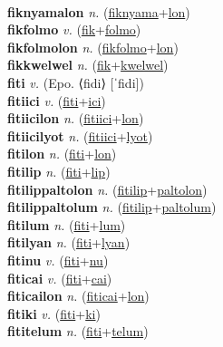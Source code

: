  \label{fiknyamales} \\
\textbf{fiknyamalon} \textit{n.} (\hyperref[fiknyama]{fiknyama}+\hyperref[lon]{lon})
 \label{fiknyamalon} \\
\textbf{fikfolmo} \textit{v.} (\hyperref[fik]{fik}+\hyperref[folmo]{folmo})
 \label{fikfolmo} \\
\textbf{fikfolmolon} \textit{n.} (\hyperref[fikfolmo]{fikfolmo}+\hyperref[lon]{lon})
 \label{fikfolmolon} \\
\textbf{fikkwelwel} \textit{n.} (\hyperref[fik]{fik}+\hyperref[kwelwel]{kwelwel})
 \label{fikkwelwel} \\
\textbf{fiti} \textit{v.} (Epo. ⟨fidi⟩ [ˈfidi])
 \label{fiti} \\
\textbf{fitiici} \textit{v.} (\hyperref[fiti]{fiti}+\hyperref[ici]{ici})
 \label{fitiici} \\
\textbf{fitiicilon} \textit{n.} (\hyperref[fitiici]{fitiici}+\hyperref[lon]{lon})
 \label{fitiicilon} \\
\textbf{fitiicilyot} \textit{n.} (\hyperref[fitiici]{fitiici}+\hyperref[lyot]{lyot})
 \label{fitiicilyot} \\
\textbf{fitilon} \textit{n.} (\hyperref[fiti]{fiti}+\hyperref[lon]{lon})
 \label{fitilon} \\
\textbf{fitilip} \textit{n.} (\hyperref[fiti]{fiti}+\hyperref[lip]{lip})
 \label{fitilip} \\
\textbf{fitilippaltolon} \textit{n.} (\hyperref[fitilip]{fitilip}+\hyperref[paltolon]{paltolon})
 \label{fitilippaltolon} \\
\textbf{fitilippaltolum} \textit{n.} (\hyperref[fitilip]{fitilip}+\hyperref[paltolum]{paltolum})
 \label{fitilippaltolum} \\
\textbf{fitilum} \textit{n.} (\hyperref[fiti]{fiti}+\hyperref[lum]{lum})
 \label{fitilum} \\
\textbf{fitilyan} \textit{n.} (\hyperref[fiti]{fiti}+\hyperref[lyan]{lyan})
 \label{fitilyan} \\
\textbf{fitinu} \textit{v.} (\hyperref[fiti]{fiti}+\hyperref[nu]{nu})
 \label{fitinu} \\
\textbf{fiticai} \textit{v.} (\hyperref[fiti]{fiti}+\hyperref[cai]{cai})
 \label{fiticai} \\
\textbf{fiticailon} \textit{n.} (\hyperref[fiticai]{fiticai}+\hyperref[lon]{lon})
 \label{fiticailon} \\
\textbf{fitiki} \textit{v.} (\hyperref[fiti]{fiti}+\hyperref[ki]{ki})
 \label{fitiki} \\
\textbf{fititelum} \textit{n.} (\hyperref[fiti]{fiti}+\hyperref[telum]{telum})
